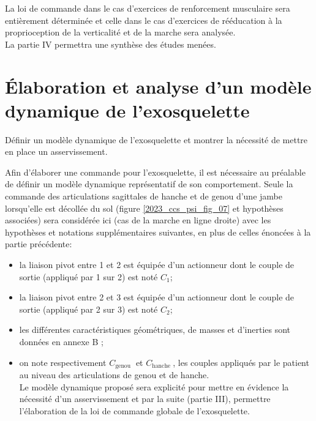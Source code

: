 La loi de commande dans le cas d'exercices de renforcement musculaire sera entièrement déterminée et celle dans le cas d'exercices de rééducation à la proprioception de la verticalité et de la marche sera analysée.\\
La partie IV permettra une synthèse des études menées.

\section{Élaboration et analyse d'un modèle dynamique de l'exosquelette}
\begin{obj}
Définir un modèle dynamique de l'exosquelette et montrer la nécessité de mettre en place un asservissement.
\end{obj}

Afin d'élaborer une commande pour l'exosquelette, il est nécessaire au préalable de définir un modèle dynamique représentatif de son comportement. Seule la commande des articulations sagittales de hanche et de genou d'une jambe lorsqu'elle est décollée du sol (figure \ref{2023_ccs_psi_fig_07} et hypothèses associées) sera considérée ici (cas de la marche en ligne droite) avec les hypothèses et notations supplémentaires suivantes, en plus de celles énoncées à la partie précédente:

\begin{itemize}
  \item la liaison pivot entre 1 et 2 est équipée d'un actionneur dont le couple de sortie (appliqué par 1 sur 2) est noté $C_{1}$;
  \item la liaison pivot entre 2 et 3 est équipée d'un actionneur dont le couple de sortie (appliqué par 2 sur 3) est noté $C_{2}$;
  \item les différentes caractéristiques géométriques, de masses et d'inerties sont données en annexe B ;
  \item on note respectivement $C_{\text {genou }}$ et $C_{\text {hanche }}$, les couples appliqués par le patient au niveau des articulations de genou et de hanche.\\
Le modèle dynamique proposé sera explicité pour mettre en évidence la nécessité d'un asservissement et par la suite (partie III), permettre l'élaboration de la loi de commande globale de l'exosquelette.
\end{itemize}

